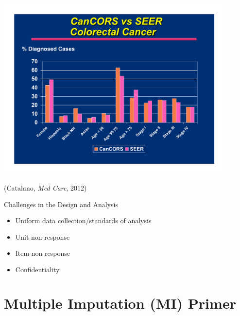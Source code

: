 \documentclass[11pt,handout]{beamer}
\begin{document}
\begin{frame}{}

\begin{center}
\includegraphics[width= 0.9\textwidth]{./figures/cancors_seer_crc.pdf}
\end{center}

(Catalano, \textsl{Med Care}, 2012)
\end{frame}


\begin{frame}{Challenges in the Design and Analysis}

  \begin{itemize}
     
     \item Uniform data collection/standards of analysis
     
     \medskip
     
     \item Unit non-response
     
     \medskip
     
     \item \textcolor{forest}{Item non-response}
     
     \medskip
     
     \item \textcolor{forest}{Confidentiality}
  \end{itemize}


\end{frame}

\section{Multiple Imputation (MI) Primer}
 
\end{document}
